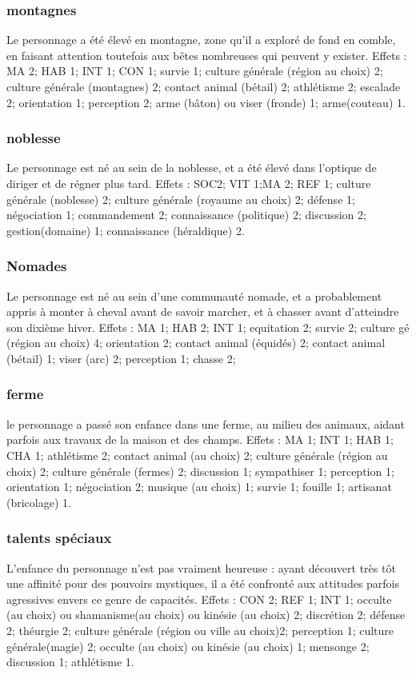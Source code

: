 \documentclass[10pt,a4paper,twocolumn]{book}
\begin{document}
\subsubsection{montagnes}
Le personnage a été élevé en montagne, zone qu’il a exploré de fond en comble, en faisant attention toutefois aux bêtes nombreuses qui peuvent y exister.
Effets : MA 2; HAB 1; INT 1; CON 1; survie 1; culture générale (région au choix) 2; culture générale (montagnes) 2; contact animal (bétail) 2; athlétisme 2;  escalade 2; orientation 1; perception 2; arme (bâton) ou viser (fronde) 1; arme(couteau) 1.
\subsubsection{noblesse}
Le personnage est né au sein de la noblesse, et a été élevé dans l’optique de diriger et de régner plus tard.
Effets : SOC2; VIT 1;MA 2; REF 1; culture générale (noblesse) 2; culture générale (royaume au choix) 2; défense 1; négociation 1; commandement 2; connaissance (politique) 2; discussion 2; gestion(domaine) 1; connaissance (héraldique) 2. 
\subsubsection{Nomades}
Le personnage est né au sein d’une communauté nomade, et a probablement appris à monter à cheval avant de savoir marcher, et à chasser avant d’atteindre son dixième hiver.
Effets : MA 1; HAB 2; INT 1; equitation 2; survie 2; culture gé (région au choix) 4; orientation 2; contact animal (équidés) 2; contact animal (bétail) 1; viser (arc) 2; perception 1; chasse 2;
\subsubsection{ferme}
le personnage a passé son enfance dans une ferme, au milieu des animaux, aidant parfois aux travaux de la maison et des champs.
Effets : MA 1; INT 1; HAB 1; CHA 1; athlétisme 2; contact animal (au choix) 2;  culture générale (région au choix) 2; culture générale (fermes) 2; discussion 1; sympathiser 1; perception 1; orientation 1; négociation 2; musique (au choix) 1; survie 1; fouille 1; artisanat (bricolage) 1.
\subsubsection{talents spéciaux}
L’enfance du personnage n’est pas vraiment heureuse : ayant découvert très tôt une affinité pour des pouvoirs mystiques, il a été confronté aux attitudes parfois agressives envers ce genre de capacités.
Effets : CON 2; REF 1; INT 1; occulte (au choix) ou shamanisme(au choix) ou kinésie (au choix) 2; discrétion 2; défense 2; théurgie 2; culture générale (région ou ville au choix)2; perception 1; culture générale(magie) 2; occulte (au choix) ou kinésie (au choix) 1; mensonge 2; discussion 1; athlétisme 1.
\end{document}
